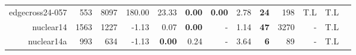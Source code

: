 \begin{landscape}
\begin{table*}[t]
\begin{tabular}{|r|r|r||r||r|r|r|r||r|r|r|r|r|}
                     edgecross24-057 &           553 &          8097 &                            180.00 &          23.33 &  \textbf{0.00} &  \textbf{0.00} &           2.78 &        \textbf{24} &                198 &                T.L &                T.L \\ 
                           nuclear14 &          1563 &          1227 &                             -1.13 &           0.07 &  \textbf{0.00} &              - &           1.14 &        \textbf{47} &               3270 &                  - &                T.L \\ 
                          nuclear14a &           993 &           634 &                             -1.13 &  \textbf{0.00} &           0.24 &              - &           3.64 &         \textbf{6} &                 89 &                  - &                T.L \\ 
\hline 
\end{tabular}\\ 
\end{table*} 
\end{landscape} 
